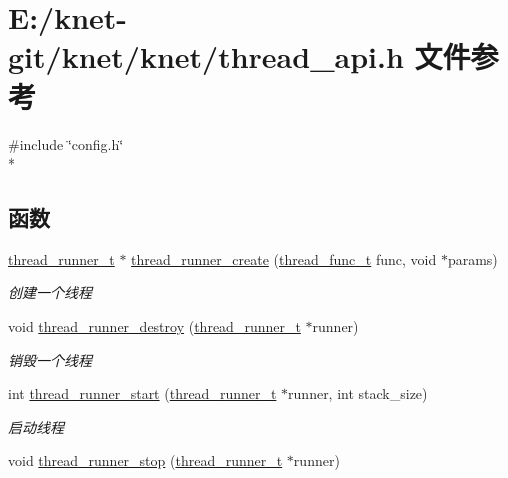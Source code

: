 \hypertarget{a00093}{}\section{E\+:/knet-\/git/knet/knet/thread\+\_\+api.h 文件参考}
\label{a00093}
{\ttfamily \#include \char`\"{}config.\+h\char`\"{}}\\*
\subsection*{函数}
\begin{DoxyCompactItemize}
\item 
\hyperlink{a00050_a9054159cde2f926ef61c28ce1e555199_a9054159cde2f926ef61c28ce1e555199}{thread\+\_\+runner\+\_\+t} $\ast$ \hyperlink{a00107_gac20d7726e152e0b49209ce228893c25d_gac20d7726e152e0b49209ce228893c25d}{thread\+\_\+runner\+\_\+create} (\hyperlink{a00050_a46bcd8005e5d86fdbc6be5af0a77156c_a46bcd8005e5d86fdbc6be5af0a77156c}{thread\+\_\+func\+\_\+t} func, void $\ast$params)
\begin{DoxyCompactList}\small\item\em 创建一个线程 \end{DoxyCompactList}\item 
void \hyperlink{a00107_ga8b9d3d45b6055971fc40f24ec6572cf6_ga8b9d3d45b6055971fc40f24ec6572cf6}{thread\+\_\+runner\+\_\+destroy} (\hyperlink{a00050_a9054159cde2f926ef61c28ce1e555199_a9054159cde2f926ef61c28ce1e555199}{thread\+\_\+runner\+\_\+t} $\ast$runner)
\begin{DoxyCompactList}\small\item\em 销毁一个线程 \end{DoxyCompactList}\item 
int \hyperlink{a00107_ga1114fd962e310f9d31ed4e83d8a21897_ga1114fd962e310f9d31ed4e83d8a21897}{thread\+\_\+runner\+\_\+start} (\hyperlink{a00050_a9054159cde2f926ef61c28ce1e555199_a9054159cde2f926ef61c28ce1e555199}{thread\+\_\+runner\+\_\+t} $\ast$runner, int stack\+\_\+size)
\begin{DoxyCompactList}\small\item\em 启动线程 \end{DoxyCompactList}\item 
void \hyperlink{a00107_gaa035f190ffd3d7f117b8fbb58716f042_gaa035f190ffd3d7f117b8fbb58716f042}{thread\+\_\+runner\+\_\+stop} (\hyperlink{a00050_a9054159cde2f926ef61c28ce1e555199_a9054159cde2f926ef61c28ce1e555199}{thread\+\_\+runner\+\_\+t} $\ast$runner)

\end{DoxyCompactItemize}
